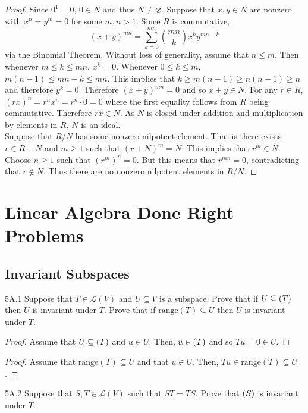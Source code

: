 \documentclass{article}
\newcommand{\sq}{\subseteq}
\newcommand{\scr}{\mathscr}
\newcommand{\range}{\mathrm{range}}
\theoremstyle{definition}
\begin{document}
	\begin{proof}
	Since $0^1 = 0$, $0 \in N$ and thus $N \neq \varnothing$. Suppose that $x,y \in N$ are nonzero with $x^n = y^m = 0$ for some $m,n > 1$. Since $R$ is commutative,
		\[(x+y)^{mn} = \sum_{k=0}^{mn} {mn \choose k} x^k y^{mn - k} \]
	via the Binomial Theorem. Without loss of generality, assume that $n \leq m$. Then whenever $m \leq k \leq mn$, $x^k = 0$. Whenever $0 \leq k \leq m$, $m(n - 1) \leq mn - k \leq mn$. This implies that $k \geq m(n-1) \geq n(n-1) \geq n$ and therefore $y^k = 0$. Therefore $(x+y)^{mn} = 0$ and so $x + y \in N$. For any $r \in R$, $(rx)^n = r^nx^n = r^n \cdot 0 = 0$ where the first equality follows from $R$ being commutative. Therefore $rx \in N$. As $N$ is closed under addition and multiplication by elements in $R$, $N$ is an ideal.\\
	
	Suppose that $R/N$ has some nonzero nilpotent element. That is there exists $r \in R - N$ and $m \geq 1$ such that $(r+N)^m = N$. This implies that $r^m \in N$. Choose $n \geq 1$  such that $(r^m)^n = 0$. But this means that $r^{mn} = 0$, contradicting that $r \not\in N$. Thus there are no nonzero nilpotent elements in $R/N$.
	\end{proof}


\section{Linear Algebra Done Right Problems}

\subsection{Invariant Subspaces}
\begin{LA}{5A.1}{}
Suppose that $T \in \scr{L}(V)$ and $U \sq V$ is a subspace. Prove that if $U \sq \null(T)$ then $U$ is invariant under $T$. Prove that if $\range(T) \sq U$ then $U$ is invariant under $T$.
\end{LA}

\begin{proof}
Assume that $U \sq \null(T)$ and $u \in U$. Then, $u \in \null(T)$ and so $Tu = 0 \in U$.
\end{proof}

\begin{proof}
Assume that $\range(T) \sq U$ and that $u \in U$. Then, $Tu \in \range(T) \sq U$.
\end{proof}

\begin{LA}{5A.2}{}
Suppose that $S,T \in \scr{L}(V)$ such that $ST = TS$. Prove that $\null(S)$ is invariant under $T$.
\end{LA}
\end{document}
